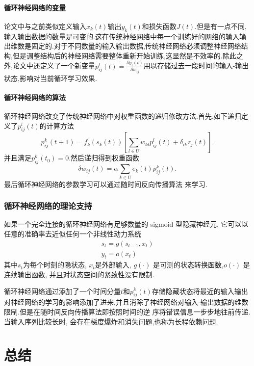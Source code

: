 \paragraph{循环神经网络的变量}

论文中与之前类似定义输入$x_k(t)$输出$y_k(t)$和损失函数$J(t)$.但是有一点不同,输入输出数据的数量是可变的.这在传统神经网络中每一个训练好的网络的输入输出维数是固定的.对于不同数量的输入输出数据,传统神经网络必须调整神经网络结构,但是调整结构后的神经网络需要整体重新开始训练,这显然是不效率的.除此之外,论文中还定义了一个新变量$p_{ij}^l(t) = \frac{\partial y_l(t)}{\partial w_{ij}}$用以存储过去一段时间的输入-输出状态,影响对当前循环学习效果.

\paragraph{循环神经网络的算法}

循环神经网络改变了传统神经网络中对权重函数的递归修改方法.首先,如下递归定义了$p_{ij}^l(t)$的计算方法
\[p_{ij}^{k}(t+1) = f_k^\prime(s_k(t))\left[ \sum_{l \in U} w_{kl} p_{ij}^l(t) + \delta_{ik} z_j(t) \right].\]
并且满足$p_{ij}^k(t_0) = 0$.然后递归得到权重函数
\[\delta w_{ij}(t) = \alpha \sum_{k \in U} e_k(t) p^k_{ij}(t).\]
最后循环神经网络的参数学习可以通过随时间反向传播算法\cite{Werbos1990} 来学习.


\subsubsection{循环神经网络的理论支持\cite{S2009Neural}}
\begin{thm}
  如果一个完全连接的循环神经网络有足够数量的 sigmoid 型隐藏神经元, 它可以以任意的准确率去近似任何一个非线性动力系统
  \begin{align*}
    s_t = g(s_{t-1},x_t) \\
    y_t = o(x_t)
  \end{align*}
  其中$s_t$为每个时刻的隐状态, $x_t$是外部输入, $g(\cdot)$ 是可测的状态转换函数,$o(\cdot)$ 是连续输出函数, 并且对状态空间的紧致性没有限制.
\end{thm}

循环神经网络通过添加了一个时间分量$t$和$p_{ij}^k(t)$存储隐藏状态将最近的输入输出对神经网络的学习的影响添加了进来,并且消除了神经网络对输入-输出数据的维数限制.但是在随时间反向传播算法即按照时间的逆
序将错误信息一步步地往前传递. 当输入序列比较长时, 会存在梯度爆炸和消失问题,也称为长程依赖问题.


\section{总结}

